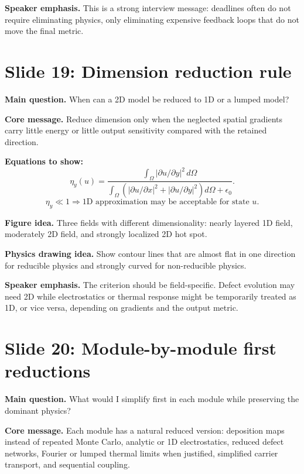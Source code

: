 \documentclass[11pt]{article}
\begin{document}
\textbf{Speaker emphasis.} This is a strong interview message: deadlines often do not require eliminating physics, only eliminating expensive feedback loops that do not move the final metric.

\section{Slide 19: Dimension reduction rule}
\begin{physicsbox}
\textbf{Main question.} When can a 2D model be reduced to 1D or a lumped model?
\end{physicsbox}

\textbf{Core message.} Reduce dimension only when the neglected spatial gradients carry little energy or little output sensitivity compared with the retained direction.

\textbf{Equations to show:}
\begin{equation*}
\eta_y(u)=
\frac{\int_\Omega |\partial u/\partial y|^2\,d\Omega}
{\int_\Omega \left(|\partial u/\partial x|^2+|\partial u/\partial y|^2\right)d\Omega+\epsilon_0}.
\end{equation*}
\begin{equation*}
\eta_y\ll 1 \Rightarrow \text{1D approximation may be acceptable for state }u.
\end{equation*}

\textbf{Figure idea.} Three fields with different dimensionality: nearly layered 1D field, moderately 2D field, and strongly localized 2D hot spot.

\textbf{Physics drawing idea.} Show contour lines that are almost flat in one direction for reducible physics and strongly curved for non-reducible physics.

\textbf{Speaker emphasis.} The criterion should be field-specific. Defect evolution may need 2D while electrostatics or thermal response might be temporarily treated as 1D, or vice versa, depending on gradients and the output metric.

\section{Slide 20: Module-by-module first reductions}
\begin{physicsbox}
\textbf{Main question.} What would I simplify first in each module while preserving the dominant physics?
\end{physicsbox}

\textbf{Core message.} Each module has a natural reduced version: deposition maps instead of repeated Monte Carlo, analytic or 1D electrostatics, reduced defect networks, Fourier or lumped thermal limits when justified, simplified carrier transport, and sequential coupling.
\end{document}
